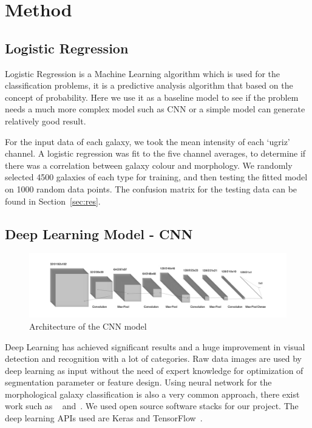 \section{Method}
\label{sec:method}
\subsection{Logistic Regression}
Logistic Regression is a Machine Learning algorithm which is used for the classification problems, it is a predictive analysis algorithm that based on the concept of probability. Here we use it as a baseline model to see if the problem needs a much more complex model such as CNN or a simple model can generate relatively good result. 

For the input data of each galaxy, we took the mean intensity of each `ugriz' channel. A logistic regression was fit to the five channel averages, to determine if there was a correlation between galaxy colour and morphology. We randomly selected 4500 galaxies of each type for training, and then testing the fitted model on 1000 random data points. The confusion matrix for the testing data can be found in Section~\ref{sec:res}.

\subsection{Deep Learning Model - CNN}

\begin{figure}[h]
	\centering
	\captionsetup{justification=centering}
	\includegraphics[width=\columnwidth]{Figures/CNNArchitecture.jpg}
	\caption{Architecture of the CNN model}
	\label{fig:cnnarch}
\end{figure}

Deep Learning has achieved significant results and a huge improvement in visual detection and recognition with a lot of categories. Raw data images are used by deep learning as input without the need of expert knowledge for optimization of segmentation parameter or feature design. Using neural network for the morphological galaxy classification is also a very common approach, there exist work such as ~\cite{banerji2010galaxy} and~\cite{khan2019deep}. 
We used open source software stacks for our project. The deep learning APIs used are Keras and TensorFlow~\cite{tensorflow}. 

